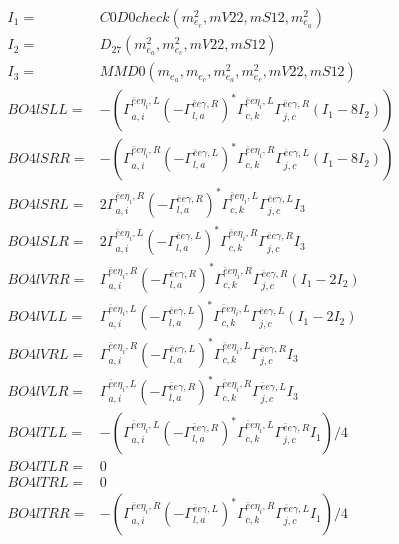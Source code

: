 \documentclass[A4,landscape]{article}
\begin{document}
\begin{align} 
I_1 = & C0D0check(m^2_{e_{{c}}}, mV22, mS12, m^2_{e_{{a}}}) \\ 
I_2 = & D_{27}(m^2_{e_{{a}}}, m^2_{e_{{c}}}, mV22, mS12) \\ 
I_3 = & MMD0(m_{e_{{a}}}, m_{e_{{c}}}, m^2_{e_{{a}}}, m^2_{e_{{c}}}, mV22, mS12) \\ 
  BO4lSLL= & -( \Gamma^{\bar{e}e \eta_i ,L}_{a, i} (- \Gamma^{\bar{e}e \gamma ,R} _{l, a})^* \Gamma^{\bar{e}e \eta_i ,L}_{c, k} \Gamma^{\bar{e}e \gamma ,R}_{j, c} (I_1 - 8 I_2)) \\ 
  BO4lSRR= & -( \Gamma^{\bar{e}e \eta_i ,R}_{a, i} (- \Gamma^{\bar{e}e \gamma ,L} _{l, a})^* \Gamma^{\bar{e}e \eta_i ,R}_{c, k} \Gamma^{\bar{e}e \gamma ,L}_{j, c} (I_1 - 8 I_2)) \\ 
  BO4lSRL= & 2  \Gamma^{\bar{e}e \eta_i ,R}_{a, i} (- \Gamma^{\bar{e}e \gamma ,R} _{l, a})^* \Gamma^{\bar{e}e \eta_i ,L}_{c, k} \Gamma^{\bar{e}e \gamma ,L}_{j, c} I_3 \\ 
  BO4lSLR= & 2  \Gamma^{\bar{e}e \eta_i ,L}_{a, i} (- \Gamma^{\bar{e}e \gamma ,L} _{l, a})^* \Gamma^{\bar{e}e \eta_i ,R}_{c, k} \Gamma^{\bar{e}e \gamma ,R}_{j, c} I_3 \\ 
  BO4lVRR= &  \Gamma^{\bar{e}e \eta_i ,R}_{a, i} (- \Gamma^{\bar{e}e \gamma ,R} _{l, a})^* \Gamma^{\bar{e}e \eta_i ,R}_{c, k} \Gamma^{\bar{e}e \gamma ,R}_{j, c} (I_1 - 2 I_2) \\ 
  BO4lVLL= &  \Gamma^{\bar{e}e \eta_i ,L}_{a, i} (- \Gamma^{\bar{e}e \gamma ,L} _{l, a})^* \Gamma^{\bar{e}e \eta_i ,L}_{c, k} \Gamma^{\bar{e}e \gamma ,L}_{j, c} (I_1 - 2 I_2) \\ 
  BO4lVRL= &  \Gamma^{\bar{e}e \eta_i ,R}_{a, i} (- \Gamma^{\bar{e}e \gamma ,L} _{l, a})^* \Gamma^{\bar{e}e \eta_i ,L}_{c, k} \Gamma^{\bar{e}e \gamma ,R}_{j, c} I_3 \\ 
  BO4lVLR= &  \Gamma^{\bar{e}e \eta_i ,L}_{a, i} (- \Gamma^{\bar{e}e \gamma ,R} _{l, a})^* \Gamma^{\bar{e}e \eta_i ,R}_{c, k} \Gamma^{\bar{e}e \gamma ,L}_{j, c} I_3 \\ 
  BO4lTLL= & -( \Gamma^{\bar{e}e \eta_i ,L}_{a, i} (- \Gamma^{\bar{e}e \gamma ,R} _{l, a})^* \Gamma^{\bar{e}e \eta_i ,L}_{c, k} \Gamma^{\bar{e}e \gamma ,R}_{j, c} I_1)/4 \\ 
  BO4lTLR= & 0 \\ 
  BO4lTRL= & 0 \\ 
  BO4lTRR= & -( \Gamma^{\bar{e}e \eta_i ,R}_{a, i} (- \Gamma^{\bar{e}e \gamma ,L} _{l, a})^* \Gamma^{\bar{e}e \eta_i ,R}_{c, k} \Gamma^{\bar{e}e \gamma ,L}_{j, c} I_1)/4 \\ 
\end{align} 
\end{document}
